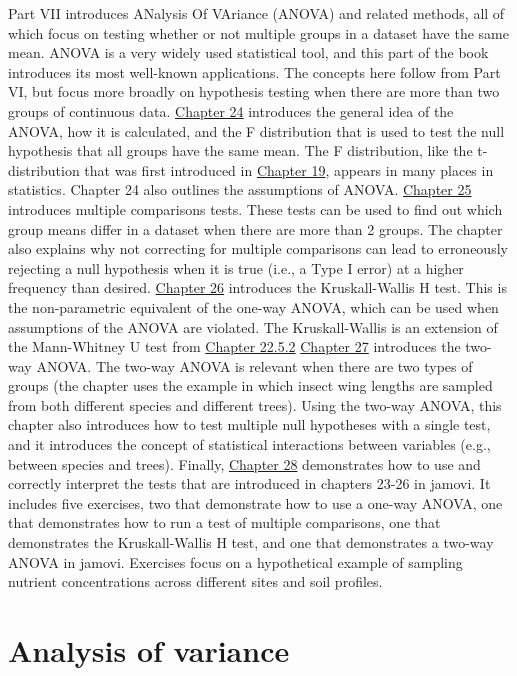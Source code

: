 \documentclass[
]{scrbook}
\begin{document}
Part VII introduces ANalysis Of VAriance (ANOVA) and related methods, all of which focus on testing whether or not multiple groups in a dataset have the same mean.
ANOVA is a very widely used statistical tool, and this part of the book introduces its most well-known applications.
The concepts here follow from Part VI, but focus more broadly on hypothesis testing when there are more than two groups of continuous data.
\protect\hyperlink{Chapter_24}{Chapter 24} introduces the general idea of the ANOVA, how it is calculated, and the F distribution that is used to test the null hypothesis that all groups have the same mean.
The F distribution, like the t-distribution that was first introduced in \protect\hyperlink{Chapter_19}{Chapter 19}, appears in many places in statistics.
Chapter 24 also outlines the assumptions of ANOVA.
\protect\hyperlink{Chapter_25}{Chapter 25} introduces multiple comparisons tests.
These tests can be used to find out which group means differ in a dataset when there are more than 2 groups.
The chapter also explains why not correcting for multiple comparisons can lead to erroneously rejecting a null hypothesis when it is true (i.e., a Type I error) at a higher frequency than desired.
\protect\hyperlink{Chapter_26}{Chapter 26} introduces the Kruskall-Wallis H test.
This is the non-parametric equivalent of the one-way ANOVA, which can be used when assumptions of the ANOVA are violated.
The Kruskall-Wallis is an extension of the Mann-Whitney U test from \protect\hyperlink{mann-whitney-u-test}{Chapter 22.5.2}
\protect\hyperlink{Chapter_27}{Chapter 27} introduces the two-way ANOVA.
The two-way ANOVA is relevant when there are two types of groups (the chapter uses the example in which insect wing lengths are sampled from both different species and different trees).
Using the two-way ANOVA, this chapter also introduces how to test multiple null hypotheses with a single test, and it introduces the concept of statistical interactions between variables (e.g., between species and trees).
Finally, \protect\hyperlink{Chapter_28}{Chapter 28} demonstrates how to use and correctly interpret the tests that are introduced in chapters 23-26 in jamovi.
It includes five exercises, two that demonstrate how to use a one-way ANOVA, one that demonstrates how to run a test of multiple comparisons, one that demonstrates the Kruskall-Wallis H test, and one that demonstrates a two-way ANOVA in jamovi.
Exercises focus on a hypothetical example of sampling nutrient concentrations across different sites and soil profiles.

\hypertarget{Chapter_24}{%
\chapter{Analysis of variance}\label{Chapter_24}}
\end{document}
